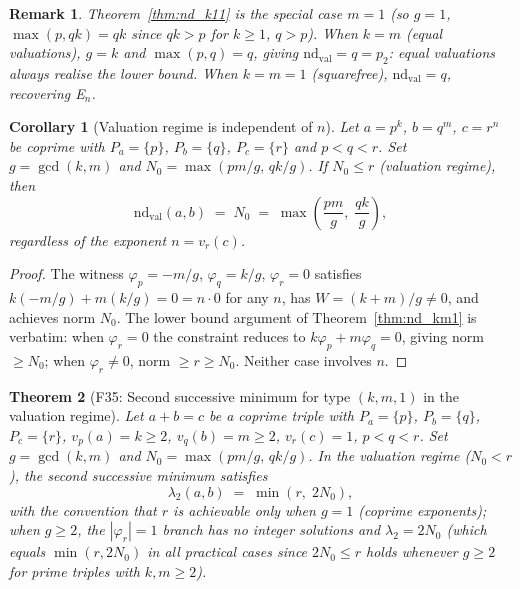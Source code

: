 \documentclass[12pt]{article}
\newtheorem{theorem}{Theorem}
\newtheorem{corollary}[theorem]{Corollary}
\newtheorem{remark}{Remark}
\theoremstyle{definition}
\begin{document}
\begin{remark}
  Theorem~\ref{thm:nd_k11} is the special case $m = 1$ (so $g = 1$,
  $\max(p, qk) = qk$ since $qk > p$ for $k \ge 1$, $q > p$).
  When $k = m$ (equal valuations), $g = k$ and
  $\max(p, q) = q$, giving $\mathrm{nd}_{\mathrm{val}} = q = p_2$:
  equal valuations always realise the lower bound.
  When $k = m = 1$ (squarefree), $\mathrm{nd}_{\mathrm{val}} = q$, recovering E$_n$.
\end{remark}

\begin{corollary}[Valuation regime is independent of $n$]\label{cor:nd_kmn_val}
  Let $a = p^k$, $b = q^m$, $c = r^n$ be coprime with $P_a=\{p\}$, $P_b=\{q\}$,
  $P_c=\{r\}$ and $p < q < r$.  Set $g = \gcd(k,m)$ and
  $N_0 = \max(pm/g,\, qk/g)$.
  If $N_0 \le r$ (valuation regime), then
  \[
    \mathrm{nd}_{\mathrm{val}}(a,b) \;=\; N_0 \;=\; \max\!\left(\frac{pm}{g},\;\frac{qk}{g}\right),
  \]
  \emph{regardless of the exponent $n = v_r(c)$}.
\end{corollary}

\begin{proof}
  The witness $\varphi_p = -m/g$, $\varphi_q = k/g$, $\varphi_r = 0$ satisfies
  $k(-m/g) + m(k/g) = 0 = n \cdot 0$ for any $n$, has $W = (k+m)/g \ne 0$,
  and achieves norm $N_0$.  The lower bound argument of
  Theorem~\ref{thm:nd_km1} is verbatim: when $\varphi_r = 0$ the constraint
  reduces to $k\varphi_p + m\varphi_q = 0$, giving norm $\ge N_0$; when
  $\varphi_r \ne 0$, norm $\ge r \ge N_0$.  Neither case involves $n$.
\end{proof}

\begin{theorem}[F35: Second successive minimum for type $(k,m,1)$ in the valuation regime]\label{thm:f35}
  Let $a + b = c$ be a coprime triple with $P_a = \{p\}$, $P_b = \{q\}$, $P_c = \{r\}$,
  $v_p(a) = k \ge 2$, $v_q(b) = m \ge 2$, $v_r(c) = 1$, $p < q < r$.
  Set $g = \gcd(k,m)$ and $N_0 = \max(pm/g,\, qk/g)$.
  In the valuation regime ($N_0 < r$), the second successive minimum satisfies
  \[
    \lambda_2(a,b) \;=\; \min(r,\; 2N_0),
  \]
  with the convention that $r$ is achievable only when $g = 1$ (coprime exponents);
  when $g \ge 2$, the $|\varphi_r|=1$ branch has no integer solutions and
  $\lambda_2 = 2N_0$ (which equals $\min(r, 2N_0)$ in all practical cases since
  $2N_0 \le r$ holds whenever $g \ge 2$ for prime triples with $k,m \ge 2$).
\end{theorem}
\end{document}
